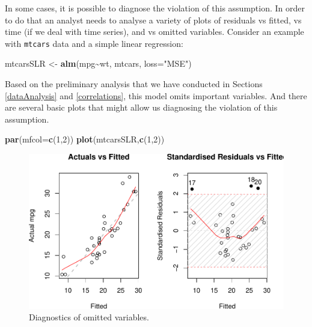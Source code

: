 \documentclass[
]{book}
\newenvironment{Shaded}{\begin{snugshade}}{\end{snugshade}}
\newcommand{\DataTypeTok}[1]{\textcolor[rgb]{0.13,0.29,0.53}{#1}}
\newcommand{\DecValTok}[1]{\textcolor[rgb]{0.00,0.00,0.81}{#1}}
\newcommand{\KeywordTok}[1]{\textcolor[rgb]{0.13,0.29,0.53}{\textbf{#1}}}
\newcommand{\NormalTok}[1]{#1}
\newcommand{\OperatorTok}[1]{\textcolor[rgb]{0.81,0.36,0.00}{\textbf{#1}}}
\newcommand{\StringTok}[1]{\textcolor[rgb]{0.31,0.60,0.02}{#1}}
\theoremstyle{definition}
\theoremstyle{definition}
\theoremstyle{definition}
\theoremstyle{definition}
\theoremstyle{remark}
\begin{document}
In some cases, it is possible to diagnose the violation of this assumption. In order to do that an analyst needs to analyse a variety of plots of residuals vs fitted, vs time (if we deal with time series), and vs omitted variables. Consider an example with \texttt{mtcars} data and a simple linear regression:

\begin{Shaded}
\begin{Highlighting}[]
\NormalTok{mtcarsSLR \textless{}{-}}\StringTok{ }\KeywordTok{alm}\NormalTok{(mpg}\OperatorTok{\textasciitilde{}}\NormalTok{wt, mtcars, }\DataTypeTok{loss=}\StringTok{"MSE"}\NormalTok{)}
\end{Highlighting}
\end{Shaded}

Based on the preliminary analysis that we have conducted in Sections \ref{dataAnalysis} and \ref{correlations}, this model omits important variables. And there are several basic plots that might allow us diagnosing the violation of this assumption.

\begin{Shaded}
\begin{Highlighting}[]
\KeywordTok{par}\NormalTok{(}\DataTypeTok{mfcol=}\KeywordTok{c}\NormalTok{(}\DecValTok{1}\NormalTok{,}\DecValTok{2}\NormalTok{))}
\KeywordTok{plot}\NormalTok{(mtcarsSLR,}\KeywordTok{c}\NormalTok{(}\DecValTok{1}\NormalTok{,}\DecValTok{2}\NormalTok{))}
\end{Highlighting}
\end{Shaded}

\begin{figure}
\centering
\includegraphics{Svetunkov---Statistics-for-Business-Analytics_files/figure-latex/diagnostics01-1.pdf}
\caption{\label{fig:diagnostics01}Diagnostics of omitted variables.}
\end{figure}
\end{document}
